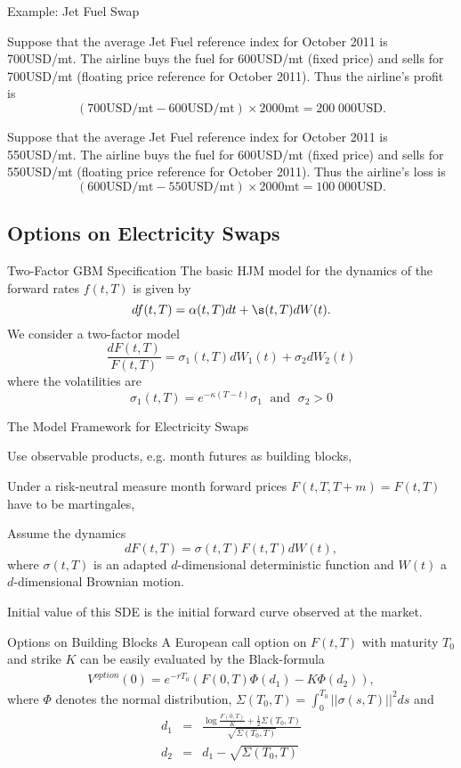 {Example: Jet Fuel Swap}
  \item<1-> Suppose that the average Jet Fuel reference index for October 2011 is 700USD/mt. The airline buys the fuel for 600USD/mt (fixed price) and sells for 700USD/mt (floating price reference for October 2011). Thus the airline's profit is
      $$(700\text{USD/mt} - 600\text{USD/mt})\times2000\text{mt} = 200\;000\text{USD}.$$
  \item<2-> Suppose that the average Jet Fuel reference index for October 2011 is 550USD/mt. The airline buys the fuel for 600USD/mt (fixed price) and sells for 550USD/mt (floating price reference for October 2011). Thus the airline's loss is
      $$(600\text{USD/mt} - 550\text{USD/mt})\times2000\text{mt} = 100\;000\text{USD}.$$

\subsection{Options on Electricity Swaps}

{Two-Factor GBM Specification}
The basic HJM model for the dynamics of the forward rates $f(t,T)$ is given by
$$
df(t,T) = \alpha(t,T) dt + \s(t,T) dW(t).
$$
We consider a two-factor model
$$
\frac{dF(t,T)}{F(t,T)}=\sigma_1(t,T)dW_1(t)+\sigma_2dW_2(t)
$$
where the volatilities are
$$
\sigma_1(t,T)=e^{-\kappa (T-t)}\sigma_1 \; \mbox{ and } \; \sigma_2>0
$$

{The Model Framework for Electricity Swaps}
\item<1-> Use observable products, e.g. month futures as building blocks,
\item<2-> Under a risk-neutral measure month forward prices $F(t,T,T+m)=F(t,T)$ have to be martingales,
\item<3-> Assume the dynamics
$$dF(t,T)=\sigma(t,T)F(t,T)dW(t),$$
where $\sigma(t,T)$ is an adapted $d$-dimensional deterministic function and
$W(t)$ a $d$-dimensional Brownian motion.
\item<4-> Initial value of this SDE is the initial forward curve observed at the market.

{Options on Building Blocks}
A European call option on $F(t,T)$ with maturity $T_0$ and strike
$K$ can be easily evaluated by the Black-formula
\begin{eqnarray}\label{eq:month-option}
V^{option}(0)=e^{-rT_0}\left(F(0,T)\Phi(d_1)-K\Phi (d_2)\right),
\end{eqnarray}
where $\Phi$ denotes the normal distribution, $\Sigma(T_0,T)=\int_0^{T_0}||\sigma(s,T)||^2ds$ and
\begin{eqnarray*}
d_1& = & \frac{\log \frac{F(0,T)}{K}+\frac{1}{2}\Sigma(T_0,T)}{\sqrt{\Sigma(T_0,T)}}\\
d_2 & = & d_1 - \sqrt{\Sigma(T_0,T)}
\end{eqnarray*}

